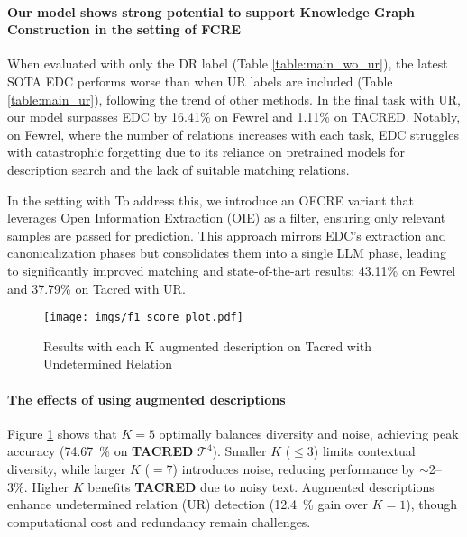 \paragraph{Our model shows strong potential to support Knowledge Graph Construction in the setting of FCRE} 

When evaluated with only the DR label (Table \ref{table:main_wo_ur}), the latest SOTA EDC performs worse than when UR labels are included (Table \ref{table:main_ur}), following the trend of other methods. In the final task with UR, our model surpasses EDC by 16.41\% on Fewrel and 1.11\% on TACRED. Notably, on Fewrel, where the number of relations increases with each task, EDC struggles with catastrophic forgetting due to its reliance on pretrained models for description search and the lack of suitable matching relations.

In the setting with 
To address this, we introduce an OFCRE variant that leverages Open Information Extraction (OIE) as a filter, ensuring only relevant samples are passed for prediction. This approach mirrors EDC’s extraction and canonicalization phases but consolidates them into a single LLM phase, leading to significantly improved matching and state-of-the-art results: 43.11\% on Fewrel and 37.79\% on Tacred with UR.

\begin{figure}[H]
    \centering
    \texttt{[image: imgs/f1\_score\_plot.pdf]}
    \caption{Results with each K augmented description on Tacred with Undetermined Relation}
    \vspace{-2mm}
    \label{fig:kaug1}
\end{figure}


\paragraph{The effects of using augmented descriptions}
Figure \ref{fig:kaug1} shows that \( K = 5 \) optimally balances diversity and noise, achieving peak accuracy (\SI{74.67}{\%} on \textbf{TACRED} $\mathcal{T}^4$). Smaller \( K \) (\( \leq 3 \)) limits contextual diversity, while larger \( K \) (\( =7 \)) introduces noise, reducing performance by \(\sim\)2--3\%. Higher \( K \) benefits \textbf{TACRED} due to noisy text. Augmented descriptions enhance undetermined relation (UR) detection (\SI{12.4}{\%} gain over \( K = 1 \)), though computational cost and redundancy remain challenges.

